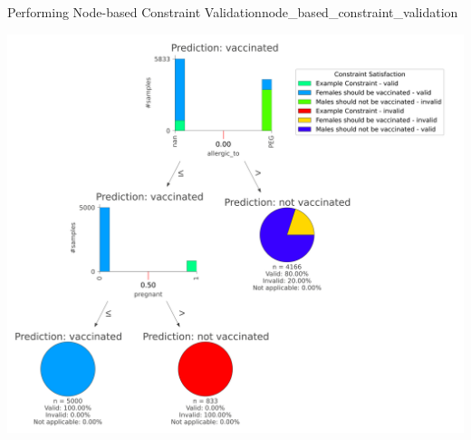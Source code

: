 \begin{Bsp}{Performing Node-based Constraint Validation}{node_based_constraint_validation}
        \captionsetup{type=htypei}
        \begin{minipage}[t]{\linewidth}
            \vspace{1ex}
            \centering
            \includegraphics[scale=.07]{images/visualizations/Annotated Decision Tree per node predictions.png}    
            \label{fig:multiple_constraints_per_node_annotated_motivating_example_decision_tree}
    \end{minipage}
\end{Bsp}